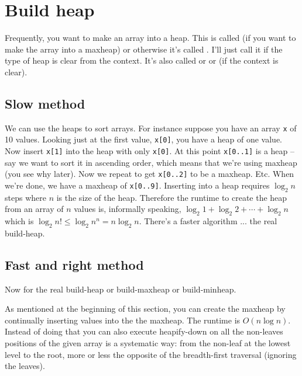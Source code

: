\section{Build heap}

Frequently, you want to make an array into a heap.
This is called
(if you want to make
the array into a maxheap)
or otherwise it's called
.
I'll just call it 
if the type of heap is clear from the context.
It's also called
or
or
 (if the context is clear).


\subsection{Slow method}

We can use the heaps to sort arrays.
For instance suppose you have an array
\verb!x! of 10 values.
Looking just at the first value, \verb!x[0]!,
you have a heap of one
value.
Now insert \verb!x[1]! into the heap with only
\verb!x[0]!.
At this point \verb!x[0..1]! is a heap --
say we want to sort it in 
ascending order, which means that we're using maxheap
(you see why later).
Now we repeat to get \verb!x[0..2]! to be a maxheap.
Etc.
When we're done, we have a maxheap of \verb!x[0..9]!.
Inserting into a heap requires $\log_2 n$ steps
where $n$ is the
size of the heap.
Therefore the 
runtime to create the heap 
from an array of $n$ values is, informally speaking, 
$\log_2 1 + \log_2 2 + \cdots + \log_2 n$
which is $\log_2 n! \leq \log_2 n^n = n \log_2 n$.
There's a faster algorithm ... the real build-heap.




\subsection{Fast and right method}

Now for the real build-heap or build-maxheap or build-minheap.

As mentioned at the beginning of this section,
you can create the maxheap by continually inserting values into the
the maxheap.
The runtime is $O(n \log n)$.
Instead of doing that you can
also execute heapify-down on all the non-leaves positions
of the given array is a systematic way: from the non-leaf at the
lowest level to the root, more or less the opposite of the
breadth-first traversal (ignoring the leaves).

